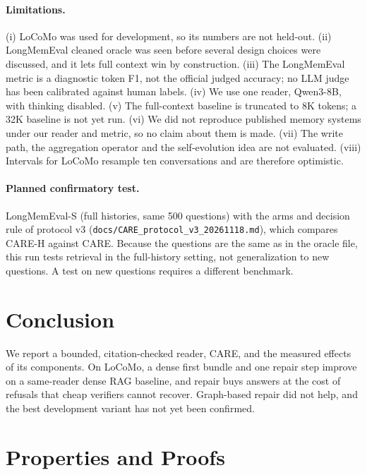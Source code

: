 \documentclass[10pt]{article}
\theoremstyle{plain}
\begin{document}
\paragraph{Limitations.} (i) LoCoMo was used for development, so its numbers are not held-out. (ii) LongMemEval
cleaned oracle was seen before several design choices were discussed, and it lets full context win by
construction. (iii) The LongMemEval metric is a diagnostic token F1, not the official judged accuracy; no
LLM judge has been calibrated against human labels. (iv) We use one reader, Qwen3-8B, with thinking disabled.
(v) The full-context baseline is truncated to 8K tokens; a 32K baseline is not yet run. (vi) We did not
reproduce published memory systems under our reader and metric, so no claim about them is made. (vii) The
write path, the aggregation operator and the self-evolution idea are not evaluated. (viii) Intervals for
LoCoMo resample ten conversations and are therefore optimistic.

\paragraph{Planned confirmatory test.} LongMemEval-S (full histories, same 500 questions) with the arms and
decision rule of protocol v3 (\texttt{docs/CARE\_protocol\_v3\_20261118.md}), which compares CARE-H against CARE.
Because the questions are the same as in the oracle file, this run tests retrieval in the full-history setting,
not generalization to new questions. A test on new questions requires a different benchmark.

\section{Conclusion}

We report a bounded, citation-checked reader, CARE, and the measured effects of its components. On LoCoMo, a
dense first bundle and one repair step improve on a same-reader dense RAG baseline, and repair buys answers at
the cost of refusals that cheap verifiers cannot recover. Graph-based repair did not help, and the best
development variant has not yet been confirmed.




\appendix

\section{Properties and Proofs}
\label{app:proofs}
\end{document}
